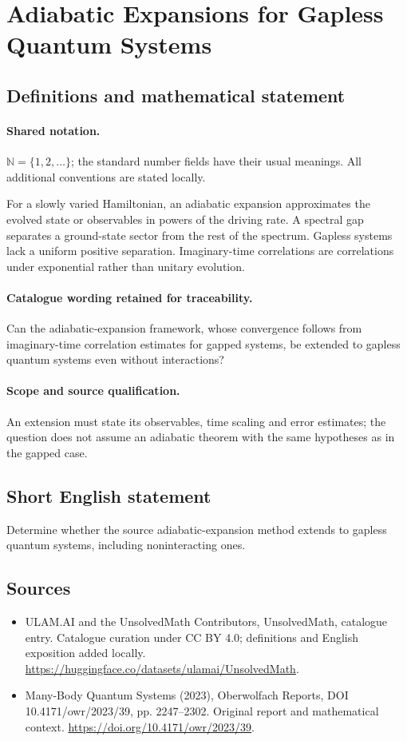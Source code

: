 \documentclass[11pt]{article}
\begin{document}
\section{Adiabatic Expansions for Gapless Quantum Systems}\label{statement}

\subsection{Definitions and mathematical statement}

\paragraph{Shared notation.}$\mathbb N=\{1,2,\ldots\}$; the standard number fields have their usual meanings. All additional conventions are stated locally.


For a slowly varied Hamiltonian, an adiabatic expansion approximates the evolved state or observables in powers of the driving rate. A spectral gap separates a ground-state sector from the rest of the spectrum. Gapless systems lack a uniform positive separation. Imaginary-time correlations are correlations under exponential rather than unitary evolution.

\paragraph{Catalogue wording retained for traceability.}
Can the adiabatic-expansion framework, whose convergence follows from imaginary-time correlation estimates for gapped systems, be extended to gapless quantum systems even without interactions?

\paragraph{Scope and source qualification.}An extension must state its observables, time scaling and error estimates; the question does not assume an adiabatic theorem with the same hypotheses as in the gapped case.
\subsection{Short English statement}
Determine whether the source adiabatic-expansion method extends to gapless quantum systems, including noninteracting ones.
\subsection{Sources}
\begin{itemize}
\item[\hypertarget{source:statement:1}{S1}] ULAM.AI and the UnsolvedMath Contributors, UnsolvedMath, catalogue entry. Catalogue curation under CC BY 4.0; definitions and English exposition added locally.
\url{https://huggingface.co/datasets/ulamai/UnsolvedMath}.
\item[\hypertarget{source:statement:2}{S2}] Many-Body Quantum Systems (2023), Oberwolfach Reports, DOI 10.4171/owr/2023/39, pp. 2247--2302. Original report and mathematical context.
\url{https://doi.org/10.4171/owr/2023/39}.
\end{itemize}
\label{end:statement}
\end{document}
